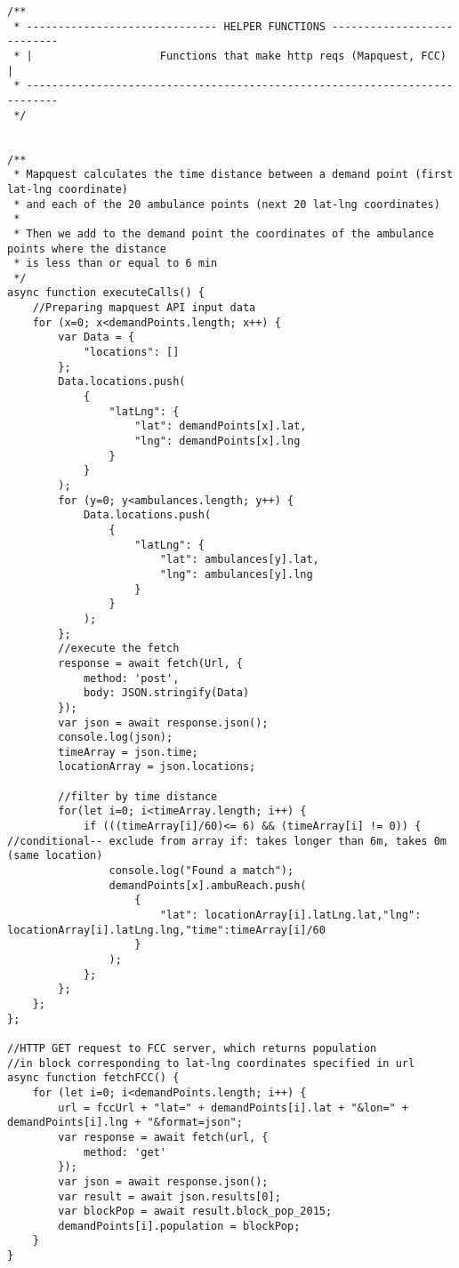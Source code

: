 \documentclass{article}
\newenvironment{code}{\captionsetup{type=listing}}{}
\begin{document}
\begin{code}
\begin{verbatim}
/**
 * ------------------------------ HELPER FUNCTIONS ---------------------------
 * |                    Functions that make http reqs (Mapquest, FCC)         |
 * ---------------------------------------------------------------------------
 */


/**
 * Mapquest calculates the time distance between a demand point (first lat-lng coordinate)
 * and each of the 20 ambulance points (next 20 lat-lng coordinates)
 * 
 * Then we add to the demand point the coordinates of the ambulance points where the distance
 * is less than or equal to 6 min
 */
async function executeCalls() {
    //Preparing mapquest API input data
    for (x=0; x<demandPoints.length; x++) {
        var Data = {
            "locations": []
        };
        Data.locations.push(
            {
                "latLng": {
                    "lat": demandPoints[x].lat,
                    "lng": demandPoints[x].lng
                }
            }
        );
        for (y=0; y<ambulances.length; y++) {
            Data.locations.push(
                {
                    "latLng": {
                        "lat": ambulances[y].lat,
                        "lng": ambulances[y].lng
                    }
                }
            );
        };
        //execute the fetch
        response = await fetch(Url, {
            method: 'post',
            body: JSON.stringify(Data)
        });
        var json = await response.json();
        console.log(json);
        timeArray = json.time;
        locationArray = json.locations;

        //filter by time distance
        for(let i=0; i<timeArray.length; i++) {
            if (((timeArray[i]/60)<= 6) && (timeArray[i] != 0)) { //conditional-- exclude from array if: takes longer than 6m, takes 0m (same location)
                console.log("Found a match");
                demandPoints[x].ambuReach.push(
                    {
                        "lat": locationArray[i].latLng.lat,"lng": locationArray[i].latLng.lng,"time":timeArray[i]/60
                    }
                );
            };
        };
    };
};

//HTTP GET request to FCC server, which returns population 
//in block corresponding to lat-lng coordinates specified in url
async function fetchFCC() {
    for (let i=0; i<demandPoints.length; i++) {
        url = fccUrl + "lat=" + demandPoints[i].lat + "&lon=" + demandPoints[i].lng + "&format=json";
        var response = await fetch(url, {
            method: 'get'
        });
        var json = await response.json();
        var result = await json.results[0];
        var blockPop = await result.block_pop_2015;
        demandPoints[i].population = blockPop;
    }
}


\end{verbatim}
\end{code}
\end{document}
